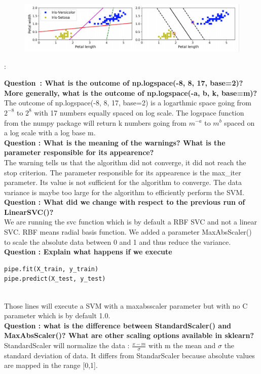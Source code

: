 \begin{figure}[ht]
	\centering 
	\includegraphics[scale = 0.35]{Pics/SVM}
	\label{fig:svmex}
\end{figure}:

\textbf{{Question} : What is the outcome of np.logspace(-8, 8, 17, base=2)? More generally, what is the outcome of np.logspace(-a, b, k, base=m)?}\\
The outcome of np.logspace(-8, 8, 17, base=2) is a logarthmic space going from $2^{-8}$ to $2^8$ with 17 numbers equally spaced on log scale.
 The logspace function from the numpy package will return k numbers going from $m^{-a}$ to $m^b$ spaced on a log scale with a log base m. \\

\textbf{Question : What is the meaning of the warnings? What is the parameter responsible for its appearence?}\\
The warning tells us that the algorithm did not converge, it did not reach the stop criterion. The parameter responsible for its appearence is the max\_iter parameter. Its value is not sufficient for the algorithm to converge. The data variance is maybe too large for the algorithm to efficiently perform the SVM. \\

\textbf{Question : What did we change with respect to the previous run of LinearSVC()?} \\
We are running the svc function which is by default a RBF SVC and not a linear SVC. RBF means radial basis function. We added a parameter MaxAbsScaler() to scale the absolute data between 0 and 1 and thus reduce the variance. \\

\textbf{Question : Explain what happens if we execute} 
\begin{verbatim}pipe.fit(X_train, y_train)
pipe.predict(X_test, y_test)\end{verbatim} \\
Those lines will execute a SVM with a maxabsscaler parameter but with no C parameter which is by default 1.0.\\

\textbf{Question : what is the difference between StandardScaler() and MaxAbsScaler()? What are other scaling options available in sklearn? }\\
StandardScaler will normalize the data : $\frac{x-m}{\sigma}$ with m the mean and $\sigma$ the standard deviation of data. It differs from StandarScaler because absolute values are mapped in the range [0,1]. \\

